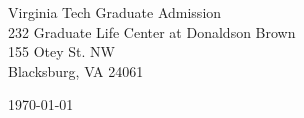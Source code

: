 \begin{minipage}{0.49\textwidth}
\begin{flushleft}
\noindent
Virginia Tech Graduate Admission\\
232 Graduate Life Center at Donaldson Brown\\
155 Otey St. NW\\
Blacksburg, VA 24061 \\

\end{flushleft}
\end{minipage}
\begin{minipage}{0.47\textwidth}
\begin{flushright}
\today
\end{flushright}
\end{minipage} \\

\newcommand{\univ}{Virginia Polytechnic Institute}
\newcommand{\univshort}{Virginia Tech}
\newcommand{\degree}{Ph.D.}
\newcommand{\dept}{Computer Science}



